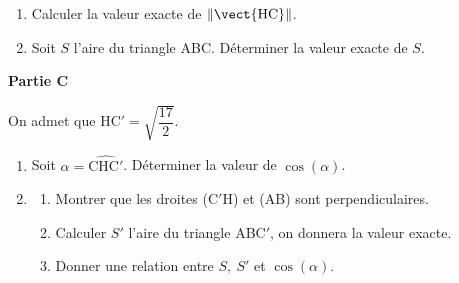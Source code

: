 \medskip

\begin{enumerate}
\item Calculer la valeur exacte de $\left\|\vect{\text{HC}}\right\|$.
\item Soit $S$ l'aire du triangle ABC. Déterminer la valeur exacte de $S$.
\end{enumerate}

\medskip

\textbf{Partie C}

\medskip

On admet que HC$'= \sqrt{\dfrac{17}{2}}$.

\medskip

\begin{enumerate}
\item Soit $\alpha = \widehat{\text{CHC}'}$. Déterminer la valeur de $\cos(\alpha)$.
\item 
	\begin{enumerate}
		\item Montrer que les droites (C$'$H) et (AB) sont perpendiculaires.
		\item Calculer $S'$ l'aire du triangle ABC$'$, on donnera la valeur exacte.
		\item Donner une relation entre $S,\: S'$ et $\cos (\alpha)$.
	\end{enumerate}
\end{enumerate}
